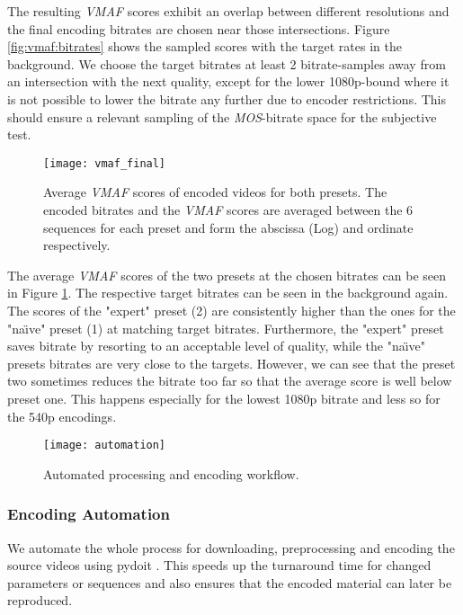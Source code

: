 The resulting \textit{VMAF} scores exhibit an overlap between different resolutions and the final encoding bitrates are chosen near those intersections. Figure \ref{fig:vmaf:bitrates} shows the sampled scores with the target rates in the background. We choose the target bitrates at least 2 bitrate-samples away from an intersection with the next quality, except for the lower 1080p-bound where it is not possible to lower the bitrate any further due to encoder restrictions. This should ensure a relevant sampling of the \textit{MOS}-bitrate space for the subjective test.

\begin{figure}[htb!]
	\centering
	\texttt{[image: vmaf\_final]}
	\caption{Average \textit{VMAF} scores of encoded videos for both presets. The encoded bitrates and the \textit{VMAF} scores are averaged between the 6 sequences for each preset and form the abscissa (Log) and ordinate respectively.}
	\label{fig:vmaf:encoded}
\end{figure}

The average \textit{VMAF} scores of the two presets at the chosen bitrates can be seen in Figure \ref{fig:vmaf:encoded}. The respective target bitrates can be seen in the background again. The scores of the "expert" preset (2) are consistently higher than the ones for the "na\"{\i}ve" preset (1) at matching target bitrates. Furthermore, the "expert" preset saves bitrate by resorting to an acceptable level of quality, while the "na\"{\i}ve" presets bitrates are very close to the targets. However, we can see that the preset two sometimes reduces the bitrate too far so that the average score is well below preset one. This happens especially for the lowest 1080p bitrate and less so for the 540p encodings.


\begin{figure}[bht!]
	\centering
	\texttt{[image: automation]}
	\caption{Automated processing and encoding workflow.}
	\label{fig:automation}
\end{figure}

\subsubsection{Encoding Automation}
We automate the whole process for downloading, preprocessing and encoding the source videos using pydoit \cite{web:pydoit}. This speeds up the turnaround time for changed parameters or sequences and also ensures that the encoded material can later be reproduced.

